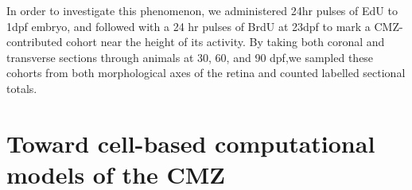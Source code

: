 In order to investigate this phenomenon, we administered 24hr pulses of EdU to 1dpf embryo, and followed with a 24 hr pulses of BrdU at 23dpf to mark a CMZ-contributed cohort near the height of its activity. By taking both coronal and transverse sections through animals at 30, 60, and 90 dpf,we sampled these cohorts from both morphological axes of the retina and counted labelled sectional totals. 

\section{Toward cell-based computational models of the CMZ}